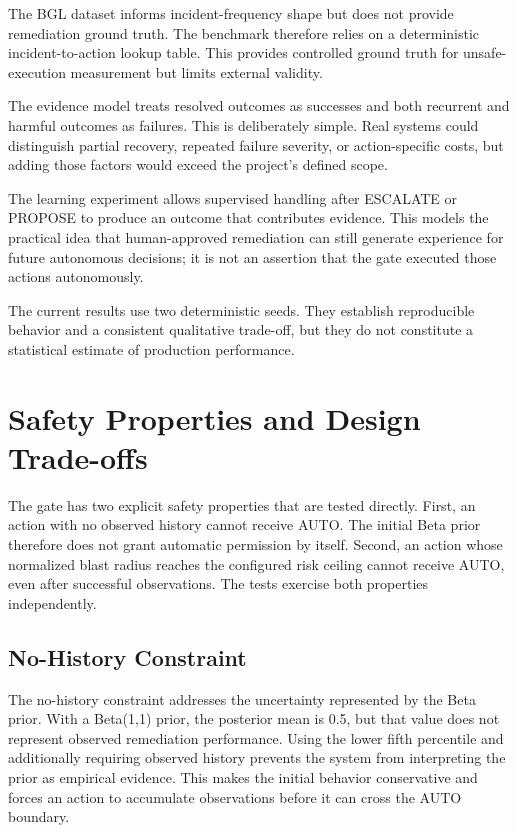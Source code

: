 \documentclass[conference]{IEEEtran}
\begin{document}
The BGL dataset informs incident-frequency shape but does not provide
remediation ground truth. The benchmark therefore relies on a deterministic
incident-to-action lookup table. This provides controlled ground truth for
unsafe-execution measurement but limits external validity.

The evidence model treats resolved outcomes as successes and both recurrent
and harmful outcomes as failures. This is deliberately simple. Real systems
could distinguish partial recovery, repeated failure severity, or action-specific
costs, but adding those factors would exceed the project's defined scope.

The learning experiment allows supervised handling after ESCALATE or PROPOSE
to produce an outcome that contributes evidence. This models the practical
idea that human-approved remediation can still generate experience for future
autonomous decisions; it is not an assertion that the gate executed those
actions autonomously.

The current results use two deterministic seeds. They establish reproducible
behavior and a consistent qualitative trade-off, but they do not constitute a
statistical estimate of production performance.

\section{Safety Properties and Design Trade-offs}
The gate has two explicit safety properties that are tested directly. First,
an action with no observed history cannot receive AUTO. The initial Beta prior
therefore does not grant automatic permission by itself. Second, an action
whose normalized blast radius reaches the configured risk ceiling cannot
receive AUTO, even after successful observations. The tests exercise both
properties independently.

\subsection{No-History Constraint}
The no-history constraint addresses the uncertainty represented by the Beta
prior. With a Beta(1,1) prior, the posterior mean is 0.5, but that value does
not represent observed remediation performance. Using the lower fifth
percentile and additionally requiring observed history prevents the system from
interpreting the prior as empirical evidence. This makes the initial behavior
conservative and forces an action to accumulate observations before it can
cross the AUTO boundary.
\end{document}
